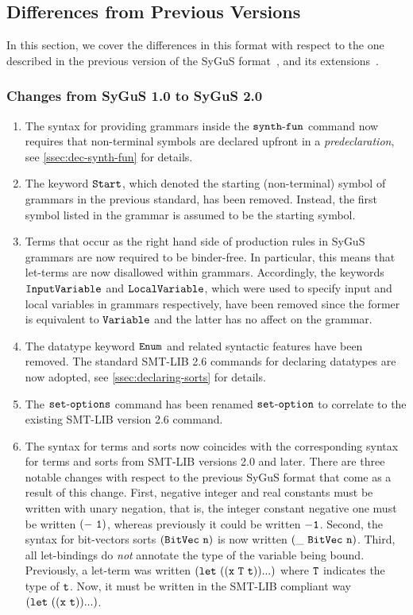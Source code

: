 \documentclass[english,a4paper,10pt]{article}
\begin{document}
\subsection{Differences from Previous Versions}

In this section, we cover the differences
in this format with respect to the one described in the previous
version of the SyGuS format~\cite{sygusFormat},
and its extensions~\cite{sygusSyntax2015,sygusSyntax2016}.
\subsubsection{Changes from SyGuS 1.0 to SyGuS 2.0}
\begin{enumerate}

\item The syntax for providing grammars inside the ${\tt synth\mbox{-}fun}$ command
now requires that non-terminal symbols are declared upfront
in a \emph{predeclaration}, see \cref{ssec:dec-synth-fun}
for details.

\item 
The keyword ${\tt Start}$, which 
denoted the starting (non-terminal) symbol of
grammars in the previous standard, has been removed.
Instead, the first symbol listed in the grammar is assumed
to be the starting symbol.

\item 
Terms that occur as the right hand side of production rules in
SyGuS grammars are now required to be binder-free.
In particular, this means that let-terms are now disallowed within grammars.
Accordingly,
the keywords ${\tt InputVariable}$ and ${\tt LocalVariable}$,
which were used to specify input and local variables in grammars
respectively, have been removed since the former is equivalent to ${\tt Variable}$
and the latter has no affect on the grammar.

\item The datatype keyword ${\tt Enum}$
and related syntactic features have been removed.
The standard SMT-LIB 2.6 commands
for declaring datatypes are now adopted,
see \cref{ssec:declaring-sorts} for details.

\item The ${\tt set\mbox{-}options}$ command has been renamed ${\tt set\mbox{-}option}$ to 
correlate to the existing SMT-LIB version 2.6 command.

\item 
The syntax for terms and sorts
now coincides with the corresponding syntax for terms and sorts 
from SMT-LIB versions 2.0 and later.
There are three notable changes
with respect to the previous SyGuS format that come as a result of this change.
First,
negative integer and real constants must be written with
unary negation, that is, the integer constant negative one
must be written ${\tt (-\ 1)}$, whereas previously it could
be written ${\tt -1}$.
Second,
the syntax for bit-vectors sorts ${\tt (BitVec\ n)}$
is now written  ${\tt (\_\ BitVec\ n)}$.
Third,
all let-bindings do \emph{not} annotate the type of the variable being bound.
Previously, a let-term was written ${\tt (let\ ((x\ T\ t)) ...)}$
where ${\tt T}$ indicates the type of ${\tt t}$.
Now, it must be written in the SMT-LIB compliant
way ${\tt (let\ ((x\ t)) ...)}$.


\end{enumerate}
\end{document}
